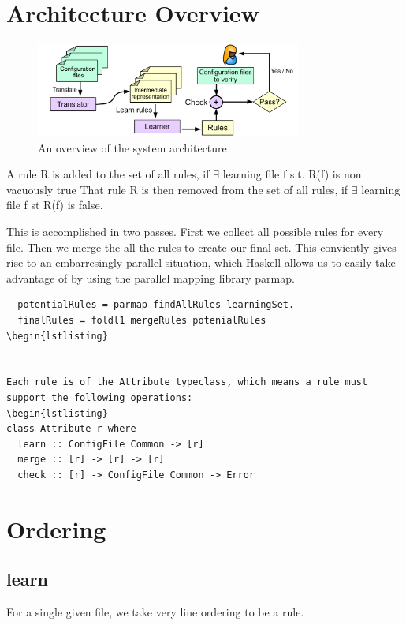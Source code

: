 
\section{Architecture Overview}

\begin{figure}[tbp] \centering
\includegraphics[width=0.78\textwidth]{figs/overview}
\caption{An overview of the \app system architecture}
\label{fig-overview}
\end{figure}




A rule R is added to the set of all rules,
  if $\exists$ learning file f s.t. R(f) is non vacuously true
That rule R is then removed from the set of all rules,
  if $\exists$ learning file f st R(f) is false.

This is accomplished in two passes.
First we collect all possible rules for every file.
Then we merge the all the rules to create our final set.
This conviently gives rise to an embarresingly parallel situation, which Haskell allows us to easily take advantage of by
  using the parallel mapping library parmap.

\begin{lstlisting}
  potentialRules = parmap findAllRules learningSet.
  finalRules = foldl1 mergeRules potenialRules
\begin{lstlisting}


Each rule is of the Attribute typeclass, which means a rule must support the following operations:
\begin{lstlisting}
class Attribute r where
  learn :: ConfigFile Common -> [r]
  merge :: [r] -> [r] -> [r] 
  check :: [r] -> ConfigFile Common -> Error
\end{lstlisting} 


\section{Ordering}
\subsection{learn}
  For a single given file, we take very line ordering to be a rule.
